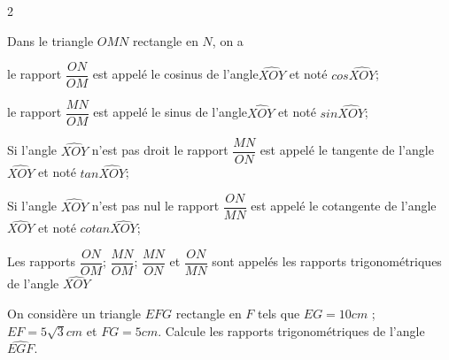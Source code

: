 \begin{multicols}{2}
{  		\par  Dans le triangle $OMN$ rectangle en $N$, on a 
  		
  		 le rapport $\dfrac{ON}{OM}$ est appelé \og le cosinus de l'angle$\widehat{XOY}$\fg{} et noté $cos\widehat{XOY}$;
  		
  		 le rapport $\dfrac{MN}{OM}$ est appelé \og le sinus de l'angle$\widehat{XOY}$\fg{} et noté $sin\widehat{XOY}$;
  		
  		 Si l'angle $\widehat{XOY}$ n'est pas droit  le rapport $\dfrac{MN}{ON}$ est appelé \og le tangente de l'angle$\widehat{XOY}$\fg{} et noté $tan\widehat{XOY}$;
  		
  		 Si l'angle $\widehat{XOY}$ n'est pas nul  le rapport $\dfrac{ON}{MN}$ est appelé \og le cotangente de l'angle $\widehat{XOY}$\fg{} et noté $cotan\widehat{XOY}$;
  		
  		 Les rapports $\dfrac{ON}{OM}$; $\dfrac{MN}{OM}$;  $\dfrac{MN}{ON}$ et $\dfrac{ON}{MN}$ sont appelés \og les rapports trigonométriques de l'angle $\widehat{XOY}$ \fg{}
  	}
  
  	
  	On considère un triangle $EFG$ rectangle en $F$ tels que $EG=10 cm$ ; $EF=5\sqrt{3} cm$ et $FG=5cm$.
  	Calcule les rapports trigonométriques de l'angle $\widehat{EGF}$.
  	\\
  	\dures 
  	

\end{multicols}
